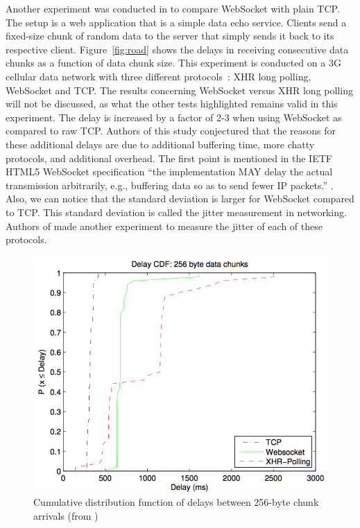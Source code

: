 \documentclass[10pt,journal,compsoc]{IEEEtran}
\newcommand{\ws}{WebSocket}
\begin{document}
Another experiment was conducted in \cite{roadblock} to compare \ws{} with plain TCP.
The setup is a web application that is a simple data echo service.
Clients send a fixed-size chunk of random data to the server that simply sends it back to its respective client.
Figure~\ref{fig:road} shows the delays in receiving consecutive data chunks as a function of data chunk size. %
This experiment is conducted on a 3G cellular data network with three different \mbox{protocols :} XHR long polling, \ws{} and TCP.
The results concerning \ws{} versus XHR long polling will not be discussed, as what the other tests highlighted remains valid in this experiment. %
The delay is increased by a factor of 2-3 when using \ws{} as compared to raw TCP. %
Authors of this study conjectured that the reasons for these additional delays are due to additional buffering time, more chatty protocols, and additional overhead.
The first point is mentioned in the IETF HTML5 \ws{} specification ``the implementation MAY delay the actual transmission arbitrarily, e.g., buffering data so as to send fewer IP packets.'' \cite{rfc6455}.
Also, we can notice that the standard deviation is larger for \ws{} compared to TCP.
This standard deviation is called the jitter measurement in networking.
Authors of \cite{roadblock} made another experiment to measure the jitter of each of these protocols.
\begin{figure}[!ht]
    \centering
    \includegraphics[width=\linewidth]{road_jitter.png}
    \caption{Cumulative distribution function of delays between 256-byte chunk arrivals (from \cite{roadblock})}
    \label{fig:road2}
\end{figure}
\end{document}
